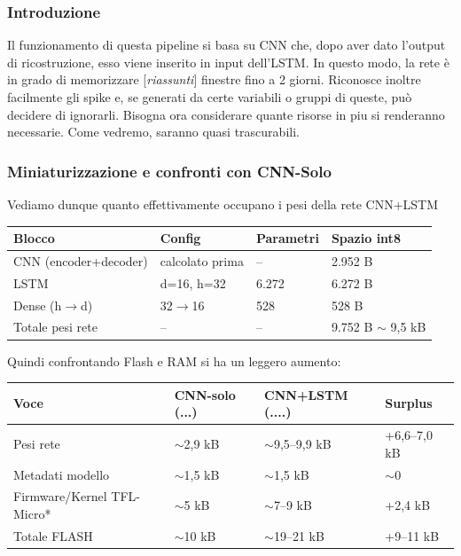 \subsubsection{Introduzione}

Il funzionamento di questa pipeline si basa su CNN che, dopo aver dato l’output di ricostruzione, esso viene inserito in input dell’LSTM. In questo modo, la rete è in grado di memorizzare [\textit{riassunti}] finestre fino a 2 giorni. Riconosce inoltre facilmente gli spike e, se generati da certe variabili o gruppi di queste, può decidere di ignorarli. Bisogna ora considerare quante risorse in piu si renderanno necessarie. Come vedremo, saranno quasi trascurabili.

\subsubsection{Miniaturizzazione e confronti con CNN-Solo}

Vediamo dunque quanto effettivamente occupano i pesi della rete CNN+LSTM

\begin{table}[h]
\centering
\begin{tabular}{l l l l}
\toprule
Blocco & Config              & Parametri & Spazio int8 \\
\midrule
CNN (encoder+decoder) & calcolato prima & --     & 2.952 B \\
LSTM                   & d=16, h=32      & 6.272 & 6.272 B \\
Dense (h$\to$d)        & 32$\to$16       & 528   & 528 B   \\
\midrule
Totale pesi rete       & --              & --     & 9.752 B $\sim$ 9,5 kB \\
\bottomrule
\end{tabular}
\end{table}

Quindi confrontando Flash e RAM si ha un leggero aumento:

\begin{table}[h]
\centering
\begin{tabular}{l l l l}
\toprule
Voce & CNN-solo (...) & CNN+LSTM (....) & Surplus \\
\midrule
Pesi rete          & $\sim$2,9 kB      & $\sim$9,5--9,9 kB & +6,6--7,0 kB \\
Metadati modello   & $\sim$1,5 kB      & $\sim$1,5 kB      & $\sim$0      \\
Firmware/Kernel TFL-Micro* & $\sim$5 kB & $\sim$7--9 kB     & +2,4 kB      \\
\midrule
Totale FLASH       & $\sim$10 kB       & $\sim$19--21 kB   & +9--11 kB    \\
\bottomrule
\end{tabular}
\end{table}

